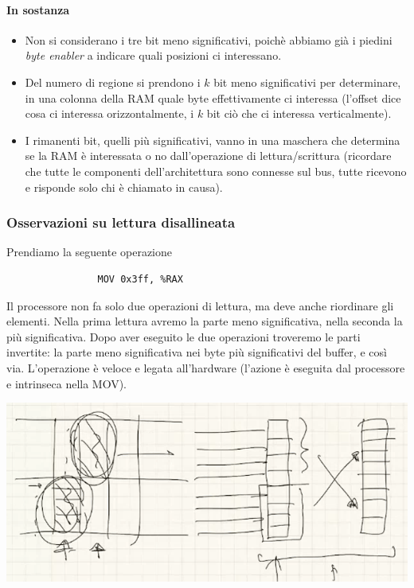 			\paragraph{In sostanza}
			\begin{itemize}
				\item Non si considerano i tre bit meno significativi, poichè abbiamo già i piedini \emph{byte enabler} a indicare quali posizioni ci interessano.
				\item Del numero di regione si prendono i $k$ bit meno significativi per determinare, in una colonna della RAM quale byte effettivamente ci interessa (l'offset dice cosa ci interessa orizzontalmente, i $k$ bit ciò che ci interessa verticalmente).
				\item I rimanenti bit, quelli più significativi, vanno in una maschera che determina se la RAM è interessata o no dall'operazione di lettura/scrittura (ricordare che tutte le componenti dell'architettura sono connesse sul bus, tutte ricevono e risponde solo chi è chiamato in causa).
			\end{itemize}
			\subsubsection{Osservazioni su lettura disallineata}  Prendiamo la seguente operazione
			\begin{verbatim}
				MOV 0x3ff, %RAX
			\end{verbatim}
			Il processore non fa solo due operazioni di lettura, ma deve anche riordinare gli elementi. Nella prima lettura avremo la parte meno significativa, nella seconda la più significativa. Dopo aver eseguito le due operazioni troveremo le parti invertite: la parte meno significativa nei byte più significativi del buffer, e così via. L'operazione è veloce e legata all'hardware (l'azione è eseguita dal processore e intrinseca nella MOV).
			\begin{center}
				\includegraphics[scale=0.90]{img/11.PNG}
			\end{center} 
